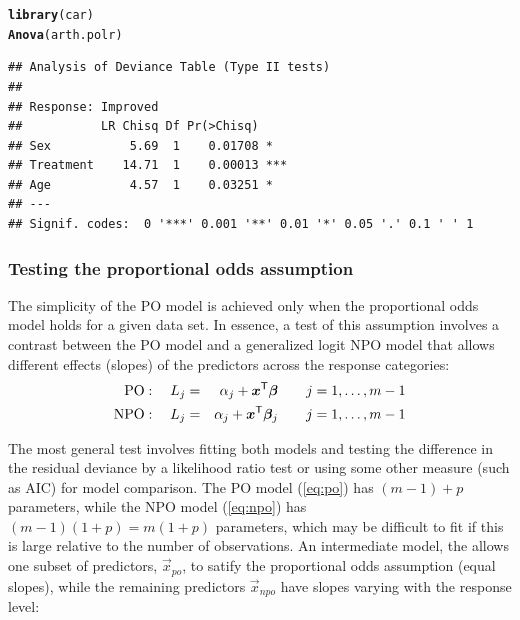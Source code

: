 \documentclass[11pt]{book}\usepackage[]{graphicx}\usepackage[]{color}
\makeatletter
\newcommand{\hlstd}[1]{\textcolor[rgb]{0.345,0.345,0.345}{#1}}%
\newcommand{\hlkwd}[1]{\textcolor[rgb]{0.737,0.353,0.396}{\textbf{#1}}}%
\newenvironment{kframe}{%
 \def\at@end@of@kframe{}%
 \ifinner\ifhmode%
  \def\at@end@of@kframe{\end{minipage}}%
  \begin{minipage}{\columnwidth}%
 \fi\fi%
 \def\FrameCommand##1{\hskip\@totalleftmargin \hskip-\fboxsep
 \colorbox{shadecolor}{##1}\hskip-\fboxsep
     \hskip-\linewidth \hskip-\@totalleftmargin \hskip\columnwidth}%
 \MakeFramed {\advance\hsize-\width
   \@totalleftmargin\z@ \linewidth\hsize
   \@setminipage}}%
 {\par\unskip\endMakeFramed%
 \at@end@of@kframe}
\newenvironment{knitrout}{}{} %
\renewenvironment{knitrout}{\small\renewcommand{\baselinestretch}{.85}}{} %
\makeatother
\begin{document}
\begin{knitrout}
\color{fgcolor}\begin{kframe}
\begin{alltt}
\hlkwd{library}\hlstd{(car)}
\hlkwd{Anova}\hlstd{(arth.polr)}
\end{alltt}
\begin{verbatim}
## Analysis of Deviance Table (Type II tests)
## 
## Response: Improved
##           LR Chisq Df Pr(>Chisq)    
## Sex           5.69  1    0.01708 *  
## Treatment    14.71  1    0.00013 ***
## Age           4.57  1    0.03251 *  
## ---
## Signif. codes:  0 '***' 0.001 '**' 0.01 '*' 0.05 '.' 0.1 ' ' 1
\end{verbatim}
\end{kframe}
\end{knitrout}

\subsubsection{Testing the proportional odds assumption}
The simplicity of the PO model is achieved only when the proportional odds model holds
for a given data set.  In essence, a test of this assumption involves a contrast between
the PO model and a generalized logit NPO model that allows different effects (slopes)
of the predictors across the response categories:
\begin{eqnarray}
  \mathrm{PO}: \quad
    L_j &=& \alpha_j + \bm{x}^\mathsf{T} \bm{\beta} \quad\quad j=1, \dots , m-1 \label{eq:po} \\
  \mathrm{NPO}: \quad
    L_j &=& \alpha_j + \bm{x}^\mathsf{T} \bm{\beta}_j \quad\quad j=1, \dots , m-1 \label{eq:npo} 
\end{eqnarray}

The most general test involves fitting both models and testing the difference in the
residual deviance by a likelihood ratio test
or using some other measure (such as AIC) for model comparison. 
The PO model (\eqref{eq:po}) has $(m-1) + p$ parameters, while the NPO model
(\eqref{eq:npo}) has $(m-1) (1+p) = m(1+p)$ parameters, which may be difficult to
fit if this is large relative to the number of observations.
An intermediate model, the 
\citep{PetersonHarrell:90} allows one subset of predictors, $\vec{x}_{po}$,
to satify the proportional odds assumption (equal slopes), while the
remaining predictors $\vec{x}_{npo}$ have slopes varying with the response level:
\end{document}
